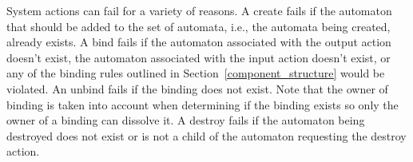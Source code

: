 System actions can fail for a variety of reasons.
A create fails if the automaton that should be added to the set of automata, i.e., the automata being created, already exists.
A bind fails if the automaton associated with the output action doesn't exist, the automaton associated with the input action doesn't exist, or any of the binding rules outlined in Section~\ref{component_structure} would be violated.
An unbind fails if the binding does not exist.
Note that the owner of binding is taken into account when determining if the binding exists so only the owner of a binding can dissolve it.
A destroy fails if the automaton being destroyed does not exist or is not a child of the automaton requesting the destroy action.

